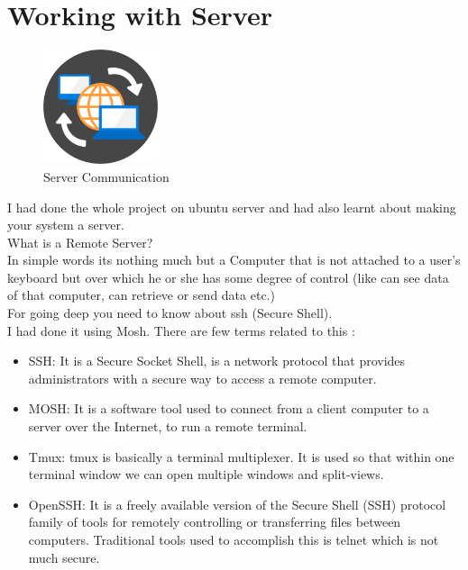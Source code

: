 \section{Working with Server}
\begin{figure}[!ht]
\centering
\includegraphics[width=0.3\textwidth]{input/images/ser.png}                   
\caption{Server Communication}
\hspace{-1.5em}
\end{figure}
I had done the whole project on ubuntu server and had also learnt about making your system a server.\\
What is a Remote Server?\\
In simple words its nothing much but a Computer that is not attached to a user’s keyboard but over which he or she has some degree of control (like can see data of that computer, can retrieve or send data etc.)\\
For going deep you need to know about ssh (Secure Shell).\\
I had done it using Mosh. There are few terms related to this :\\
\begin{itemize}
\item SSH: It is a Secure Socket Shell, is a network protocol that provides administrators with a secure way to access a remote computer.
\item MOSH: It is a software tool used to connect from a client computer to a server over the Internet, to run a remote terminal. 
\item Tmux: tmux is basically a terminal multiplexer. It is used so that within
one terminal window we can open multiple windows and split-views.
\item OpenSSH: It is a freely available version of the Secure Shell (SSH) protocol family of tools for remotely controlling or transferring files between computers. Traditional tools used to accomplish this is telnet which is not much secure.
\end{itemize}

